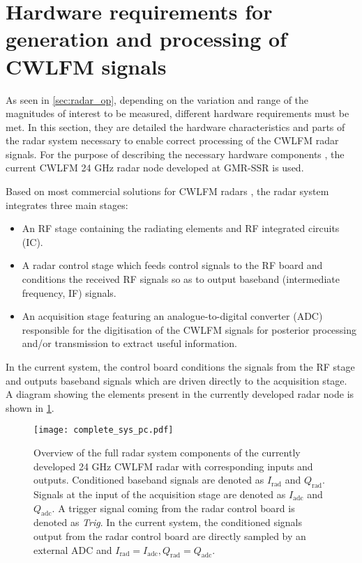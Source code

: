 \section{Hardware requirements for generation and processing of CWLFM signals} \label{sec:general_hw_req}

As seen in \cref{sec:radar_op}, depending on the variation and range of the magnitudes of interest to be measured, different hardware requirements must be met. In this section, they are detailed the hardware characteristics and parts of the radar system necessary to enable correct processing of the CWLFM radar signals. For the purpose of describing the necessary hardware components \cite{Richards2010}, the current CWLFM 24 GHz radar node developed at GMR-SSR \cite{Sardinero2022, Montesano2019} is used.

Based on most commercial solutions for CWLFM radars \cite{Peng2019}, the radar system integrates three main stages:
\begin{itemize}
	\item An RF stage containing the radiating elements and RF integrated circuits (IC).
	\item A radar control stage which feeds control signals to the RF board and conditions the received RF signals so as to output baseband (intermediate frequency, IF) signals.
	\item An acquisition stage featuring an analogue-to-digital converter (ADC) responsible for the digitisation of the CWLFM signals for posterior processing and/or transmission to extract useful information.
\end{itemize}
 In the current system, the control board conditions the signals from the RF stage and outputs baseband signals which are driven directly to the acquisition stage. A diagram showing the elements present in the currently developed radar node is shown in \cref{fig:current_system}.

\begin{figure}[ht]
	\centering
	\texttt{[image: complete\_sys\_pc.pdf]}
	\caption{Overview of the full radar system components of the currently developed 24 GHz CWLFM radar with corresponding inputs and outputs. Conditioned baseband signals are denoted as $I_{\mathrm{rad}}$ and $Q_{\mathrm{rad}}$. Signals at the input of the acquisition stage are denoted as $I_{\mathrm{adc}}$ and $Q_{\mathrm{adc}}$. A trigger signal coming from the radar control board is denoted as \textit{Trig}. In the current system, the conditioned signals output from the radar control board are directly sampled by an external ADC and $I_{\mathrm{rad}} = I_{\mathrm{adc}},Q_{\mathrm{rad}} = Q_{\mathrm{adc}}$. \label{fig:current_system}}
\end{figure}

